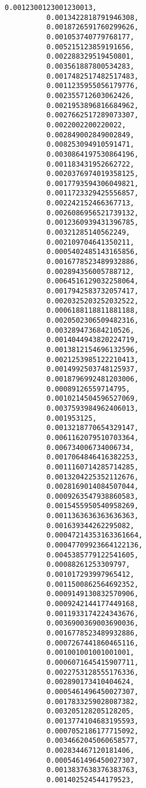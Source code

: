 \documentclass[11pt]{article}
\begin{document}
\begin{Verbatim}[commandchars=\\\{\}]
          0.0012300123001230013,
          0.0013422818791946308,
          0.0018726591760299626,
          0.001053740779768177,
          0.005215123859191656,
          0.002288329519450801,
          0.003561887800534283,
          0.0017482517482517483,
          0.0011235955056179776,
          0.002355712603062426,
          0.0021953896816684962,
          0.0027662517289073307,
          0.0022002200220022,
          0.002849002849002849,
          0.008253094910591471,
          0.0030864197530864196,
          0.001183431952662722,
          0.0020376974019358125,
          0.0017793594306049821,
          0.0011723329425556857,
          0.002242152466367713,
          0.0026086956521739132,
          0.0012360939431396785,
          0.00321285140562249,
          0.002109704641350211,
          0.0005402485143165856,
          0.0016778523489932886,
          0.002894356005788712,
          0.0064516129032258064,
          0.0017942583732057417,
          0.0020325203252032522,
          0.0006188118811881188,
          0.0020502306509482316,
          0.003289473684210526,
          0.0014044943820224719,
          0.0013812154696132596,
          0.0021253985122210413,
          0.0014992503748125937,
          0.0018796992481203006,
          0.00089126559714795,
          0.0010214504596527069,
          0.0037593984962406013,
          0.001953125,
          0.0013218770654329147,
          0.0061162079510703364,
          0.006734006734006734,
          0.0017064846416382253,
          0.0011160714285714285,
          0.0013204225352112676,
          0.0028169014084507044,
          0.0009263547938860583,
          0.0015455950540958269,
          0.0011363636363636363,
          0.001639344262295082,
          0.00047214353163361664,
          0.00047709923664122136,
          0.0045385779122541605,
          0.00088261253309797,
          0.001017293997965412,
          0.0011500862564692352,
          0.0009149130832570906,
          0.0009242144177449168,
          0.0011933174224343676,
          0.0036900369003690036,
          0.0016778523489932886,
          0.0007267441860465116,
          0.001001001001001001,
          0.0006071645415907711,
          0.0022753128555176336,
          0.002890173410404624,
          0.0005461496450027307,
          0.0017833259028087382,
          0.003205128205128205,
          0.0013774104683195593,
          0.0007052186177715092,
          0.0034662045060658577,
          0.002834467120181406,
          0.0005461496450027307,
          0.0013837638376383763,
          0.001402524544179523,

\end{Verbatim}
\end{document}
